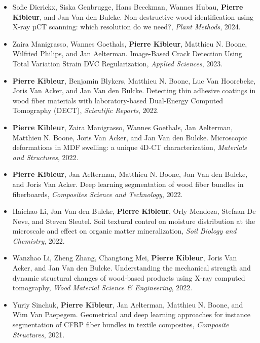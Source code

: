 \documentclass[oneside, english, 10pt, a4paper]{memoir}
\begin{document}
\begin{itemize}[leftmargin=*]
		\item Sofie Dierickx, Siska Genbrugge, Hans Beeckman, Wannes Hubau, \textbf{Pierre Kibleur}, and Jan Van den Bulcke. Non-destructive wood identification using X-ray µCT scanning: which resolution do we need?, \emph{Plant Methods}, 2024.
		
		\item Zaira Manigrasso, Wannes Goethals, \textbf{Pierre Kibleur}, Matthieu N. Boone, Wilfried Philips, and Jan Aelterman. Image-Based Crack Detection Using Total Variation Strain DVC Regularization, \emph{Applied Sciences}, 2023.
		
		\item \textbf{Pierre Kibleur}, Benjamin Blykers, Matthieu N. Boone, Luc Van Hoorebeke, Joris Van Acker, and Jan Van den Bulcke. Detecting thin adhesive coatings in wood fiber materials with laboratory-based Dual-Energy Computed Tomography (DECT), \emph{Scientific Reports}, 2022.
		
		\item  {\textbf{Pierre Kibleur}, Zaira Manigrasso, Wannes Goethals, Jan Aelterman, Matthieu N. Boone, Joris Van Acker, and Jan Van den Bulcke}. {Microscopic deformations in MDF swelling: a unique 4D-CT characterization}, \emph{Materials and Structures}, 2022.
		
		\item  {\textbf{Pierre Kibleur}, Jan Aelterman, Matthieu N. Boone, Jan Van den Bulcke, and Joris Van Acker}. {Deep learning segmentation of wood fiber bundles in fiberboards}, \emph{Composites Science and Technology},  2022.
		
		\item Haichao Li, Jan Van den Bulcke, \textbf{Pierre Kibleur}, Orly Mendoza, Stefaan De Neve, and Steven Sleutel. Soil textural control on moisture distribution at the microscale and effect on organic matter mineralization, \emph{Soil Biology and Chemistry}, 2022.
		
		\item {Wanzhao Li, Zheng Zhang, Changtong Mei, \textbf{Pierre Kibleur}, Joris Van Acker, and Jan Van den Bulcke}. {Understanding the mechanical strength and dynamic structural changes of wood-based products using X-ray computed tomography}, \emph{Wood Material Science {\&} Engineering}, 2022.
		
		\item {Yuriy Sinchuk, \textbf{Pierre Kibleur}, Jan Aelterman, Matthieu N. Boone, and Wim Van Paepegem}. {Geometrical and deep learning approaches for instance segmentation of CFRP fiber bundles in textile composites}, \emph{Composite Structures}, 2021.
		

\end{itemize}
\end{document}
